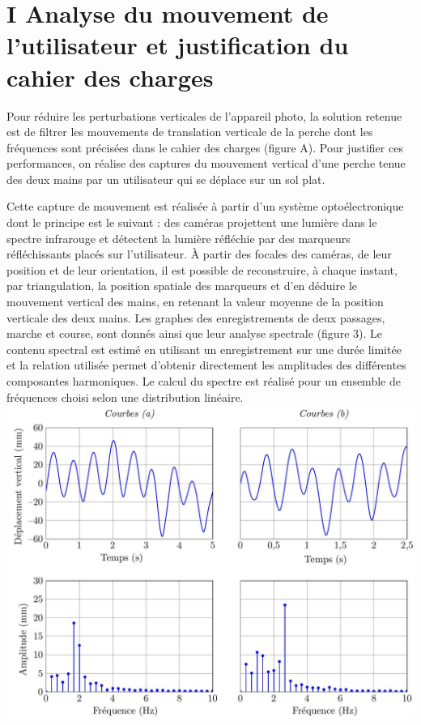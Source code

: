 \documentclass[10pt]{article}
\begin{document}
\section*{I Analyse du mouvement de l'utilisateur et justification du cahier des charges }
Pour réduire les perturbations verticales de l'appareil photo, la solution retenue est de filtrer les mouvements de translation verticale de la perche dont les fréquences sont précisées dans le cahier des charges (figure A). Pour justifier ces performances, on réalise des captures du mouvement vertical d'une perche tenue des deux mains par un utilisateur qui se déplace sur un sol plat.

Cette capture de mouvement est réalisée à partir d'un système optoélectronique dont le principe est le suivant : des caméras projettent une lumière dans le spectre infrarouge et détectent la lumière réfléchie par des marqueurs réfléchissants placés sur l'utilisateur. À partir des focales des caméras, de leur position et de leur orientation, il est possible de reconstruire, à chaque instant, par triangulation, la position spatiale des marqueurs et d'en déduire le mouvement vertical des mains, en retenant la valeur moyenne de la position verticale des deux mains. Les graphes des enregistrements de deux passages, marche et course, sont donnés ainsi que leur analyse spectrale (figure 3). Le contenu spectral est estimé en utilisant un enregistrement sur une durée limitée et la relation utilisée permet d'obtenir directement les amplitudes des différentes composantes harmoniques. Le calcul du spectre est réalisé pour un ensemble de fréquences choisi selon une distribution linéaire.
\includegraphics[max width=\textwidth, center]{2022_12_31_ed674c1a831ea1bff3a0g-02}
\end{document}
